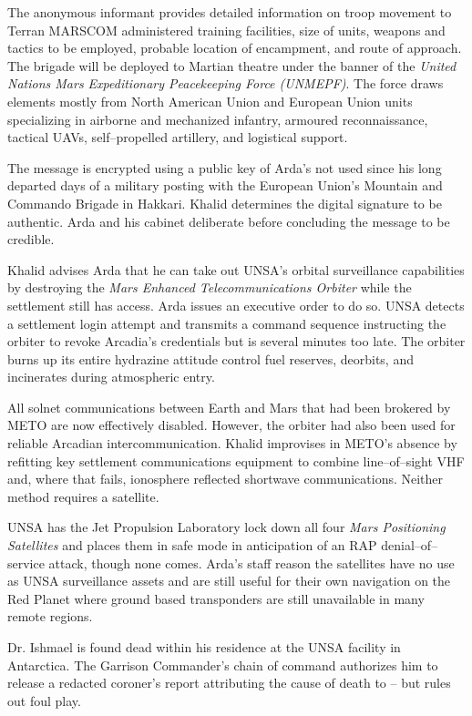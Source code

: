 The anonymous informant provides detailed information on troop movement to Terran MARSCOM administered training facilities, size of units, weapons and tactics to be employed, probable location of encampment, and route of approach. The brigade will be deployed to Martian theatre under the banner of the {\it United Nations Mars Expeditionary Peacekeeping Force (UNMEPF)}. The force draws elements mostly from North American Union and European Union units specializing in airborne and mechanized infantry, armoured reconnaissance, tactical UAVs, self--propelled artillery, and logistical support.

The message is encrypted using a public key of Arda's not used since his long departed days of a military posting with the European Union's Mountain and Commando Brigade in Hakkari. Khalid determines the digital signature to be authentic. Arda and his cabinet deliberate before concluding the message to be credible.
\StopTimelineDate

Khalid advises Arda that he can take out UNSA's orbital surveillance capabilities by destroying the {\it Mars Enhanced Telecommunications Orbiter} while the settlement still has access. Arda issues an executive order to do so. UNSA detects a settlement login attempt and transmits a command sequence instructing the orbiter to revoke Arcadia's credentials but is several minutes too late. The orbiter burns up its entire hydrazine attitude control fuel reserves, deorbits, and incinerates during atmospheric entry.

All solnet communications between Earth and Mars that had been brokered by METO are now effectively disabled. However, the orbiter had also been used for reliable Arcadian intercommunication. Khalid improvises in METO's absence by refitting key settlement communications equipment to combine line--of--sight VHF and, where that fails, ionosphere reflected shortwave communications. Neither method requires a satellite.

UNSA has the Jet Propulsion Laboratory lock down all four {\it Mars Positioning Satellites} and places them in safe mode in anticipation of an RAP denial--of--service attack, though none comes. Arda's staff reason the satellites have no use as UNSA surveillance assets and are still useful for their own navigation on the Red Planet where ground based transponders are still unavailable in many remote regions.
\StopTimelineDate

Dr. Ishmael is found dead within his residence at the UNSA facility in Antarctica. The Garrison Commander's chain of command authorizes him to release a redacted coroner's report attributing the cause of death to  -- but rules out foul play. 

